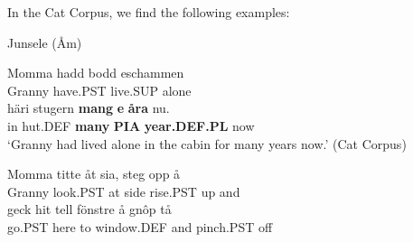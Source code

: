 \z

In the Cat Corpus, we find the following examples:


\item 

Junsele (Åm)



\item 


 \ea\label{}
\gll Momma  hadd  bodd  eschammen\\


Granny  have.PST  live.SUP  alone\\

 \ea\label{}
\gll häri  stugern  \textbf{mang}\textbf{  e}\textbf{  åra} nu.\\


in  hut.DEF  \textbf{many} \textbf{PIA} \textbf{year.DEF.PL} now\\

\glt ‘Granny had lived alone in the cabin for many years now.’ (Cat Corpus)

\z

\item 


 \ea\label{}
\gll Momma  titte  åt  sia,   steg  opp  å\\


Granny  look.PST  at  side  rise.PST  up  and\\

 \ea\label{}
\gll geck  hit  tell  fönstre  å  gnôp  tå\\


go.PST  here  to  window.DEF  and  pinch.PST  off\\

